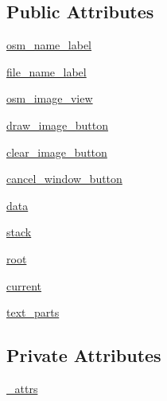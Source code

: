 \subsection*{Public Attributes}
\begin{DoxyCompactItemize}
\item 
\hyperlink{classsrc_1_1client_1_1gui_1_1draw__osm__image_1_1Ui__DrawOSMImage_a2b1e0af59ecf27571fdc8c3e10e06cbe}{osm\_\-name\_\-label}
\item 
\hyperlink{classsrc_1_1client_1_1gui_1_1draw__osm__image_1_1Ui__DrawOSMImage_a07223c3ff2f3512c88331d1d54474876}{file\_\-name\_\-label}
\item 
\hyperlink{classsrc_1_1client_1_1gui_1_1draw__osm__image_1_1Ui__DrawOSMImage_adda5ab30a12601633cbb509cb1e93d96}{osm\_\-image\_\-view}
\item 
\hyperlink{classsrc_1_1client_1_1gui_1_1draw__osm__image_1_1Ui__DrawOSMImage_a7881c9278c5b3bda45ae692203645a30}{draw\_\-image\_\-button}
\item 
\hyperlink{classsrc_1_1client_1_1gui_1_1draw__osm__image_1_1Ui__DrawOSMImage_a80743f254af37d9e7afa62f19fa679e3}{clear\_\-image\_\-button}
\item 
\hyperlink{classsrc_1_1client_1_1gui_1_1draw__osm__image_1_1Ui__DrawOSMImage_a8571b8c3c2aa49f057f45c245ba400d0}{cancel\_\-window\_\-button}
\item 
\hyperlink{classsrc_1_1client_1_1gui_1_1draw__osm__image_1_1Ui__DrawOSMImage_a2200fcbc2402d1a81c27ce0dfa3d104b}{data}
\item 
\hyperlink{classsrc_1_1client_1_1gui_1_1draw__osm__image_1_1Ui__DrawOSMImage_a1a28203ecd95b2c4a90f98e34c159d83}{stack}
\item 
\hyperlink{classsrc_1_1client_1_1gui_1_1draw__osm__image_1_1Ui__DrawOSMImage_ac26b73a5094217e2408b232237c25001}{root}
\item 
\hyperlink{classsrc_1_1client_1_1gui_1_1draw__osm__image_1_1Ui__DrawOSMImage_aa88647cdf54c6850811cba93c537f7b5}{current}
\item 
\hyperlink{classsrc_1_1client_1_1gui_1_1draw__osm__image_1_1Ui__DrawOSMImage_a8240ceeebe5f3de2bf9a4fae20f3ef3c}{text\_\-parts}
\end{DoxyCompactItemize}
\subsection*{Private Attributes}
\begin{DoxyCompactItemize}
\item 
\hyperlink{classsrc_1_1client_1_1gui_1_1draw__osm__image_1_1Ui__DrawOSMImage_a0c1a8ab40e8f286a26dca3c16419b06a}{\_\-attrs}
\end{DoxyCompactItemize}


